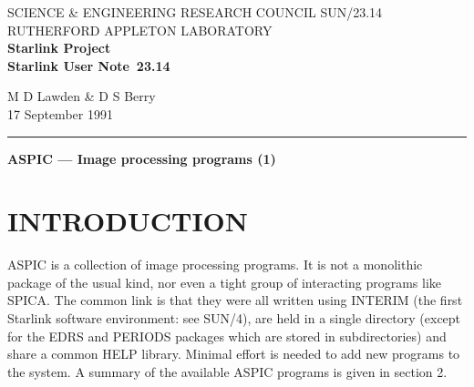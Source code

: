 \pagestyle{myheadings}

\newcommand{\stardoccategory}  {Starlink User Note}
\newcommand{\stardocinitials}  {SUN}
\newcommand{\stardocnumber}    {23.14}
\newcommand{\stardocauthors}   {M D Lawden \& D S Berry}
\newcommand{\stardocdate}      {17 September 1991}
\newcommand{\stardoctitle}     {ASPIC --- Image processing programs (1)}

\newcommand{\stardocname}{\stardocinitials /\stardocnumber}
\markright{\stardocname}
\setlength{\textwidth}{160mm}
\setlength{\textheight}{230mm}
\setlength{\topmargin}{-2mm}
\setlength{\oddsidemargin}{0mm}
\setlength{\evensidemargin}{0mm}
\setlength{\parindent}{0mm}
\setlength{\parskip}{\medskipamount}
\setlength{\unitlength}{1mm}


\thispagestyle{empty}
SCIENCE \& ENGINEERING RESEARCH COUNCIL \hfill \stardocname\\
RUTHERFORD APPLETON LABORATORY\\
{\large\bf Starlink Project\\}
{\large\bf \stardoccategory\ \stardocnumber}
\begin{flushright}
\stardocauthors\\
\stardocdate
\end{flushright}
\vspace{-4mm}
\rule{\textwidth}{0.5mm}
\vspace{5mm}
\begin{center}
{\Large\bf \stardoctitle}
\end{center}
\vspace{5mm}

\setlength{\parskip}{0mm}
\tableofcontents
\setlength{\parskip}{\medskipamount}
\markright{\stardocname}

\section {INTRODUCTION}

ASPIC is a collection of image processing programs.
It is not a monolithic package of the usual kind, nor even a tight group of
interacting programs like SPICA.
The common link is that they were all written using INTERIM (the first Starlink
software environment: see SUN/4), are held in a single directory (except for
the EDRS and PERIODS packages which are stored in subdirectories) and share a
common HELP library.
Minimal effort is needed to add new programs to the system.
A summary of the available ASPIC programs is given in section 2.


